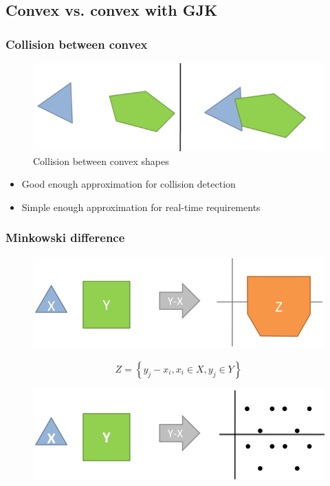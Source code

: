 \documentclass{beamer}
\begin{document}
\subsection{Convex vs. convex with GJK}
\begin{frame}
  \frametitle{Collision between convex}
  \begin{figure}[p]
    \centering
    \includegraphics[width=0.8\linewidth]{convexcollision}
    \caption{Collision between convex shapes}
  \end{figure}
  \begin{itemize}
  \item Good enough approximation for collision detection
  \item Simple enough approximation for real-time requirements
  \end{itemize}
\end{frame}

\begin{frame}
  \frametitle{Minkowski difference}

  \begin{figure}[p]
    \centering
    \includegraphics[width=0.7\linewidth]{minkowski}
  \end{figure}
  \vspace{-1em}
   {
  $$
  Z = \left\{ y_j - x_i, x_i \in X, y_j \in Y \right\}
  $$
  }
  \vspace{-2em}
   {

  \begin{figure}[p]
    \centering
    \includegraphics[width=0.7\linewidth]{minkowskidetail}
  \end{figure}
  }

\end{frame}
\end{document}
